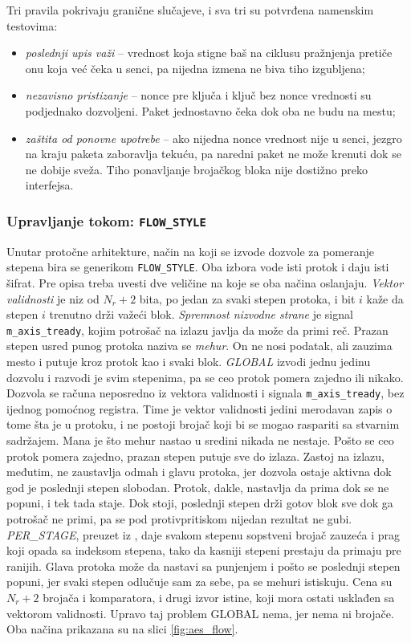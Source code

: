 Tri pravila pokrivaju granične slučajeve, i sva tri su potvrđena namenskim testovima:
\begin{itemize}[itemsep=2pt]
    \item \textit{poslednji upis važi} -- vrednost koja stigne baš na ciklusu pražnjenja pretiče onu koja već čeka u senci, pa nijedna izmena ne biva tiho izgubljena;
    \item \textit{nezavisno pristizanje} -- nonce pre ključa i ključ bez nonce vrednosti su podjednako dozvoljeni. Paket jednostavno čeka dok oba ne budu na mestu;
    \item \textit{zaštita od ponovne upotrebe} -- ako nijedna nonce vrednost nije u senci, jezgro na kraju paketa zaboravlja tekuću, pa naredni paket ne može krenuti dok se ne dobije sveža. Tiho ponavljanje brojačkog bloka nije dostižno preko interfejsa.
\end{itemize}

\subsubsection{Upravljanje tokom: \texttt{FLOW\_STYLE}}
\label{subsec:hw_aes_flow}

Unutar protočne arhitekture, način na koji se izvode dozvole za pomeranje stepena bira se generikom \texttt{FLOW\_STYLE}. Oba izbora vode isti protok i daju isti šifrat.
\smallbreak
Pre opisa treba uvesti dve veličine na koje se oba načina oslanjaju. \textit{Vektor validnosti} je niz od $N_r + 2$ bita, po jedan za svaki stepen protoka, i bit $i$ kaže da stepen $i$ trenutno drži važeći blok. \textit{Spremnost nizvodne strane} je signal \texttt{m\_axis\_tready}, kojim potrošač na izlazu javlja da može da primi reč. Prazan stepen usred punog protoka naziva se \textit{mehur}. On ne nosi podatak, ali zauzima mesto i putuje kroz protok kao i svaki blok.
\smallbreak
\textit{GLOBAL} izvodi jednu jedinu dozvolu i razvodi je svim stepenima, pa se ceo protok pomera zajedno ili nikako. Dozvola se računa neposredno iz vektora validnosti i signala \texttt{m\_axis\_tready}, bez ijednog pomoćnog registra. Time je vektor validnosti jedini merodavan zapis o tome šta je u protoku, i ne postoji brojač koji bi se mogao raspariti sa stvarnim sadržajem. Mana je što mehur nastao u sredini nikada ne nestaje. Pošto se ceo protok pomera zajedno, prazan stepen putuje sve do izlaza. Zastoj na izlazu, međutim, ne zaustavlja odmah i glavu protoka, jer dozvola ostaje aktivna dok god je poslednji stepen slobodan. Protok, dakle, nastavlja da prima dok se ne popuni, i tek tada staje. Dok stoji, poslednji stepen drži gotov blok sve dok ga potrošač ne primi, pa se pod protivpritiskom nijedan rezultat ne gubi.
\smallbreak
\textit{PER\_STAGE}, preuzet iz \cite{gavrilovic_diplomski}, daje svakom stepenu sopstveni brojač zauzeća i prag koji opada sa indeksom stepena, tako da kasniji stepeni prestaju da primaju pre ranijih. Glava protoka može da nastavi sa punjenjem i pošto se poslednji stepen popuni, jer svaki stepen odlučuje sam za sebe, pa se mehuri istiskuju. Cena su $N_r + 2$ brojača i komparatora, i drugi izvor istine, koji mora ostati usklađen sa vektorom validnosti. Upravo taj problem GLOBAL nema, jer nema ni brojače. Oba načina prikazana su na slici \ref{fig:aes_flow}.

